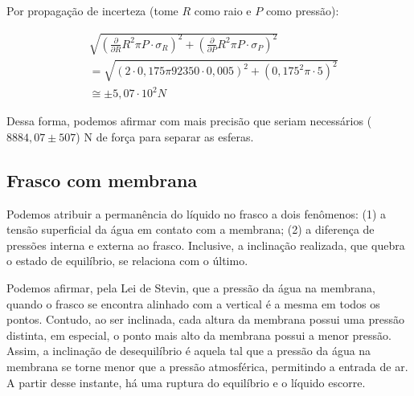 Por propagação de incerteza (tome \(R\) como raio e \(P\) como pressão):

\begin{align*}
&\sqrt{\left( \frac{\partial }{\partial R} R^{2}\pi P \cdot \sigma_R \right)^{2} + \left( \frac{\partial }{\partial P} R^{2}\pi P \cdot\sigma_P \right)^{2}}\\
&= \sqrt{\left( 2 \cdot 0,175 \pi 92350 \cdot 0,005 \right)^{2} + \left(0,175^{2}\pi \cdot 5 \right)^{2}} \\
&\cong  \pm 5,07 \cdot 10^2 \unit{N}
\end{align*}

Dessa forma, podemos afirmar com mais precisão que seriam necessários
(\(8884,07 \pm 507 \)) N de força para separar as esferas.

\subsection{Frasco com membrana}

Podemos atribuir a permanência do líquido no frasco a dois fenômenos: (1) a
tensão superficial da água em contato com a membrana; (2) a diferença de
pressões interna e externa ao frasco. Inclusive, a inclinação realizada, que
quebra o estado de equilíbrio, se relaciona com o último. 

Podemos afirmar, pela Lei de Stevin, que a pressão da água na membrana, quando o
frasco se encontra alinhado com a vertical é a mesma em todos os pontos.
Contudo, ao ser inclinada, cada altura da membrana possui uma pressão distinta,
em especial, o ponto mais alto da membrana possui a menor pressão. Assim, a
inclinação de desequilíbrio é aquela tal que a pressão da água na membrana se
torne menor que a pressão atmosférica, permitindo a entrada de ar. A partir
desse instante, há uma ruptura do equilíbrio e o líquido escorre.
